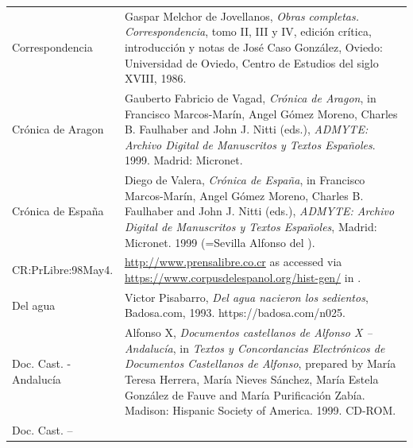\begin{tabularx}{\textwidth}{XX}
Correspondencia & Gaspar Melchor de Jovellanos, \textit{Obras completas. Correspondencia}, tomo II, III y IV, edición crítica, introducción y notas de José Caso González, Oviedo: Universidad de Oviedo, Centro de Estudios del siglo XVIII, 1986.\\
Crónica de Aragon & Gauberto Fabricio de Vagad, \textit{Crónica de Aragon}, in Francisco Marcos-Marín, Angel Gómez Moreno, Charles B. Faulhaber and John J. Nitti (eds.), \textit{ADMYTE: Archivo Digital de Manuscritos y Textos Españoles}. 1999. Madrid: Micronet. \\
Crónica de España & Diego de Valera, \textit{Crónica de España}, in Francisco Marcos-Marín, Angel Gómez Moreno, Charles B. Faulhaber and John J. Nitti (eds.), \textit{ADMYTE: Archivo Digital de Manuscritos y Textos Españoles}, Madrid: Micronet. 1999 (=Sevilla Alfonso del \citealt{Puerto1482}).\\
CR:PrLibre:98May4. & \url{http://www.prensalibre.co.cr} as accessed via \url{https://www.corpusdelespanol.org/hist-gen/} in \citealt{May2021}.\\
Del agua & Victor Pisabarro, \textit{Del agua nacieron los sedientos}, Badosa.com, 1993. https://badosa.com/n025.\\
Doc. Cast. - Andalucía & Alfonso X, \textit{Documentos castellanos de Alfonso X – Andalucía}, in \textit{Textos y Concordancias Electrónicos de Documentos Castellanos de Alfonso}, prepared by María Teresa Herrera, María Nieves Sánchez, María Estela González de Fauve and María Purificación Zabía. Madison: Hispanic Society of America. 1999. CD-ROM. \\
Doc. Cast. – 


\end{tabularx}

